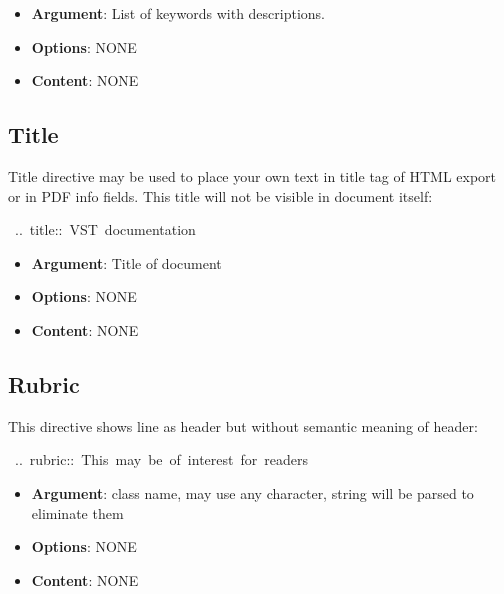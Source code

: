 \documentclass[12pt]{article}
\begin{document}
\begin{itemize}
\item
\textbf{Argument}: List of keywords with descriptions.

\item
\textbf{Options}: NONE

\item
\textbf{Content}: NONE
\end{itemize}
\hypertarget{ltitle}{}
\subsection{Title}

Title directive may be used to place your own text in title tag of HTML export
or in PDF info fields. This title will not be visible in document itself:

\begin{ttfamily}\begin{flushleft}
\mbox{~..~title::~VST~documentation}\\
\end{flushleft}\end{ttfamily}

\begin{itemize}
\item
\textbf{Argument}: Title of document

\item
\textbf{Options}: NONE

\item
\textbf{Content}: NONE
\end{itemize}
\hypertarget{lrubric}{}
\subsection{Rubric}

This directive shows line as header but without semantic meaning of header:

\begin{ttfamily}\begin{flushleft}
\mbox{~..~rubric::~This~may~be~of~interest~for~readers}\\
\end{flushleft}\end{ttfamily}

\begin{itemize}
\item
\textbf{Argument}: class name, may use any character, string will be parsed to
eliminate them

\item
\textbf{Options}: NONE

\item
\textbf{Content}: NONE
\end{itemize}
\hypertarget{lraw}{}
\end{document}
